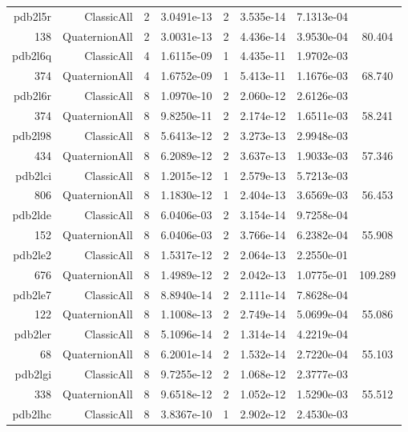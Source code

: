 \begin{xltabular}{\textwidth}{r|rcS[table-format=1.4e+2]cS[table-format=1.3e+2]S[table-format=1.4e+2]S[table-format=-1.3]}
pdb2l5r & ClassicAll & 2 & 3.0491e-13 & 2 & 3.535e-14 & 7.1313e-04 & \\
138 & QuaternionAll & 2 & 3.0031e-13 & 2 & 4.436e-14 & 3.9530e-04 & 80.404\\  \addlinespace
pdb2l6q & ClassicAll & 4 & 1.6115e-09 & 1 & 4.435e-11 & 1.9702e-03 & \\
374 & QuaternionAll & 4 & 1.6752e-09 & 1 & 5.413e-11 & 1.1676e-03 & 68.740\\  \addlinespace
pdb2l6r & ClassicAll & 8 & 1.0970e-10 & 2 & 2.060e-12 & 2.6126e-03 & \\
374 & QuaternionAll & 8 & 9.8250e-11 & 2 & 2.174e-12 & 1.6511e-03 & 58.241\\  \addlinespace
pdb2l98 & ClassicAll & 8 & 5.6413e-12 & 2 & 3.273e-13 & 2.9948e-03 & \\
434 & QuaternionAll & 8 & 6.2089e-12 & 2 & 3.637e-13 & 1.9033e-03 & 57.346\\  \addlinespace
pdb2lci & ClassicAll & 8 & 1.2015e-12 & 1 & 2.579e-13 & 5.7213e-03 & \\
806 & QuaternionAll & 8 & 1.1830e-12 & 1 & 2.404e-13 & 3.6569e-03 & 56.453\\  \addlinespace
pdb2lde & ClassicAll & 8 & 6.0406e-03 & 2 & 3.154e-14 & 9.7258e-04 & \\
152 & QuaternionAll & 8 & 6.0406e-03 & 2 & 3.766e-14 & 6.2382e-04 & 55.908\\  \addlinespace
pdb2le2 & ClassicAll & 8 & 1.5317e-12 & 2 & 2.064e-13 & 2.2550e-01 & \\
676 & QuaternionAll & 8 & 1.4989e-12 & 2 & 2.042e-13 & 1.0775e-01 & 109.289\\  \addlinespace
pdb2le7 & ClassicAll & 8 & 8.8940e-14 & 2 & 2.111e-14 & 7.8628e-04 & \\
122 & QuaternionAll & 8 & 1.1008e-13 & 2 & 2.749e-14 & 5.0699e-04 & 55.086\\  \addlinespace
pdb2ler & ClassicAll & 8 & 5.1096e-14 & 2 & 1.314e-14 & 4.2219e-04 & \\
68 & QuaternionAll & 8 & 6.2001e-14 & 2 & 1.532e-14 & 2.7220e-04 & 55.103\\  \addlinespace
pdb2lgi & ClassicAll & 8 & 9.7255e-12 & 2 & 1.068e-12 & 2.3777e-03 & \\
338 & QuaternionAll & 8 & 9.6518e-12 & 2 & 1.052e-12 & 1.5290e-03 & 55.512\\  \addlinespace
pdb2lhc & ClassicAll & 8 & 3.8367e-10 & 1 & 2.902e-12 & 2.4530e-03 & \\

\end{xltabular}
